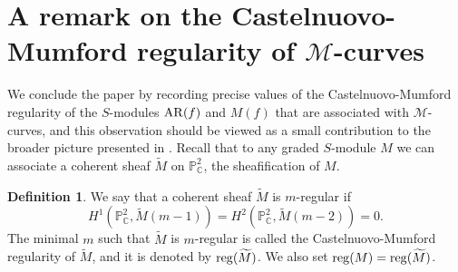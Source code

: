 \documentclass[11pt]{article}
\theoremstyle{plain}
\theoremstyle{definition}
\newtheorem{definition}[theorem]{Definition}
\theoremstyle{remark}
\begin{document}
\section[A remark on Castelnuovo-Mumford regularity of M-curves]{A remark on the Castelnuovo-Mumford regularity of $\mathscr{M}$-curves}
We conclude the paper by recording precise values of the Castelnuovo-Mumford regularity of the $S$-modules ${\rm AR}(f)$ and $M(f)$ that are associated with $\mathscr{M}$-curves, and this observation should be viewed as a small contribution to the broader picture presented in \cite{CMD}. Recall that to any graded $S$-module $M$ we can associate a coherent sheaf $\widetilde{M}$ on $\mathbb{P}^{2}_{\mathbb{C}}$, the sheafification of $M$.
\begin{definition}
We say that a coherent sheaf $\widetilde{M}$ is $m$-regular if
$$H^{1}(\mathbb{P}^{2}_{\mathbb{C}}, \widetilde{M}(m-1)) = H^{2}(\mathbb{P}^{2}_{\mathbb{C}}, \widetilde{M}(m-2))=0.$$
The minimal $m$ such that $\widetilde{M}$ is $m$-regular is called the Castelnuovo-Mumford regularity of $\widetilde{M}$, and it is denoted by ${\rm reg}(\widetilde{M})$. We also set ${\rm reg}(M) = {\rm reg}(\widetilde{M})$.
\end{definition}
\end{document}

